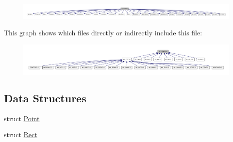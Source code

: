 \nopagebreak
\begin{figure}[H]
\begin{center}
\leavevmode
\includegraphics[width=400pt]{ID__HEADS_8H__incl}
\end{center}
\end{figure}
This graph shows which files directly or indirectly include this file:
\nopagebreak
\begin{figure}[H]
\begin{center}
\leavevmode
\includegraphics[width=400pt]{ID__HEADS_8H__dep__incl}
\end{center}
\end{figure}
\subsection*{Data Structures}
\begin{DoxyCompactItemize}
\item 
struct \hyperlink{structPoint}{Point}
\item 
struct \hyperlink{structRect}{Rect}
\end{DoxyCompactItemize}

